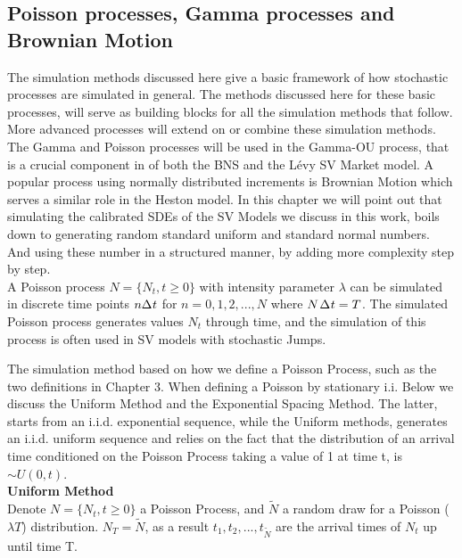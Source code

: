 
\subsection{Poisson processes, Gamma processes and Brownian Motion}

The simulation methods discussed here give a basic framework of how stochastic processes are simulated in general. The methods discussed here for these basic processes, will serve as building blocks for all the simulation methods that follow. More advanced processes will extend on or combine these simulation methods.\\

The Gamma and Poisson processes will be used in the Gamma-OU process, that is a crucial component in of both the BNS and the Lévy SV Market model. A popular process using normally distributed increments is Brownian Motion which serves a similar role in the Heston model. In this chapter we will point out that simulating the calibrated SDEs of the SV Models we discuss in this work, boils down to generating random standard uniform and standard normal numbers. And using these number in a structured manner, by adding more complexity step by step.\\

A Poisson process $N=\{N_{t},t\geq 0\}$ with intensity parameter $\lambda$ can be simulated in discrete time points $n \Delta \hspace{0.05em} t $ for $n = 0, 1, 2,...,N$ where $N \hspace{0.1em} \Delta \hspace{0.05em} t = T$. The simulated Poisson process generates values $N_{t}$ through time, and the simulation of this process is often used in SV models with stochastic Jumps.

The simulation method  based on how we define a Poisson Process, such as the two definitions in Chapter 3. When defining a Poisson by stationary i.i. Below we discuss the Uniform Method and the Exponential Spacing Method. The latter, starts from an i.i.d. exponential sequence, while the Uniform methods, generates an i.i.d. uniform sequence and relies on the fact that the distribution of an arrival time conditioned on the Poisson Process taking a value of 1 at time t, is $\sim U(0,t)$.\\

\textbf{Uniform Method} \\
Denote $N=\{N_{t},t\geq 0\}$ a Poisson Process, and $\tilde{N}$ a random draw for a Poisson ($\lambda T$) distribution.
$N_{T} = \tilde{N}$, as a result $t_1, t_2, ...,t_{\tilde{N}}$ are the arrival times of $N_t$ up until time T.


